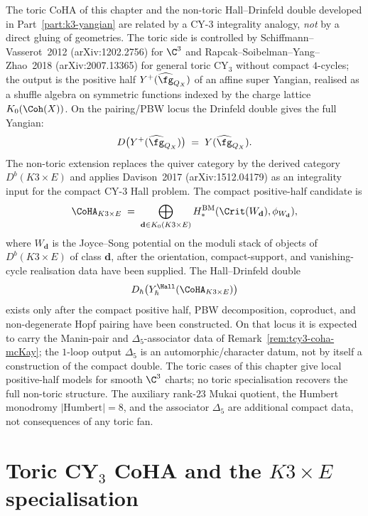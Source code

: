 \begin{remark}
\label{rem:tcy3-coha-k3e}
The toric CoHA of this chapter and the non-toric Hall--Drinfeld double
developed in Part~\ref{part:k3-yangian} are related by a CY-$3$
integrality analogy, \emph{not} by a direct gluing of geometries. The
toric side is controlled by Schiffmann--Vasserot~2012
(arXiv:1202.2756) for $\C^3$ and Rapcak--Soibelman--Yang--Zhao~2018
(arXiv:2007.13365) for general toric CY$_3$ without compact
$4$-cycles; the output is the positive half
$Y^+(\widehat{\fg}_{Q_X})$ of an affine super Yangian, realised as a
shuffle algebra on symmetric functions indexed by the charge lattice
$K_0(\Coh(X))$. On the pairing/PBW locus the Drinfeld double gives the
full Yangian:
\[
 D\bigl( Y^+(\widehat{\fg}_{Q_X}) \bigr) \;=\; Y(\widehat{\fg}_{Q_X}).
\]
The non-toric extension replaces the quiver category by the derived
category $D^b(K3 \times E)$ and applies Davison~2017
(arXiv:1512.04179) as an integrality input for the compact CY-$3$
Hall problem. The compact positive-half candidate is
\[
 \CoHA_{K3 \times E} \;=\; \bigoplus_{\mathbf{d} \in K_0(K3 \times E)}
 H^{\mathrm{BM}}_*(\Crit(W_{\mathbf{d}}), \phi_{W_{\mathbf{d}}}),
\]
where $W_{\mathbf{d}}$ is the Joyce--Song potential on the moduli stack
of objects of $D^b(K3 \times E)$ of class $\mathbf{d}$, after the
orientation, compact-support, and vanishing-cycle realisation data have
been supplied. The Hall--Drinfeld double
\[
 D_{\hbar}\bigl( Y^{\Hall}_{\hbar}( \CoHA_{K3 \times E} ) \bigr)
\]
exists only after the compact positive half, PBW decomposition,
coproduct, and non-degenerate Hopf pairing have been constructed. On
that locus it is expected to carry the Manin-pair and
$\Delta_5$-associator data of Remark~\ref{rem:tcy3-coha-mcKay}; the
$1$-loop output $\Delta_5$ is an automorphic/character datum, not by
itself a construction of the compact double. The toric cases of this
chapter give local positive-half models for smooth $\C^3$ charts; no
toric specialisation recovers the full non-toric structure. The
auxiliary rank-$23$ Mukai quotient, the Humbert monodromy
$|\mathrm{Humbert}| = 8$, and the associator $\Delta_5$ are additional
compact data, not consequences of any toric fan.
\end{remark}

\section{Toric CY\texorpdfstring{$_3$}{-3} CoHA and the \texorpdfstring{$K3\times E$}{K3x E} specialisation}
\label{sec:tcy3-phi-arrow}

